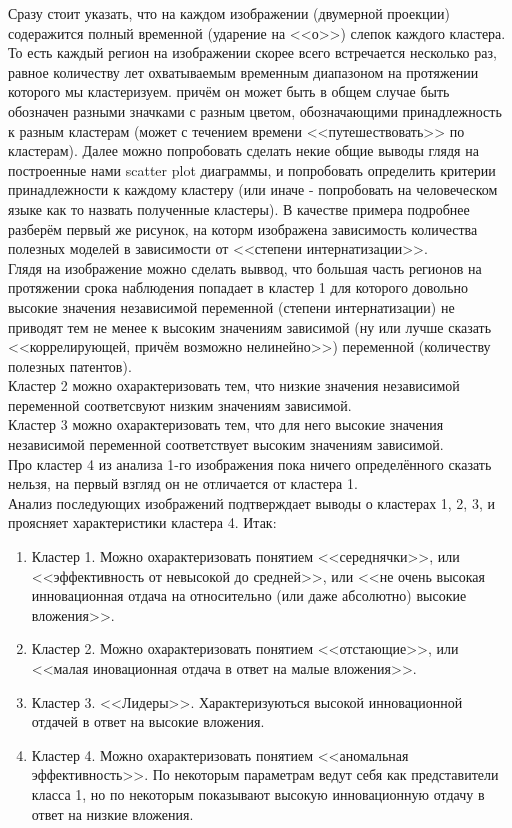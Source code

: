 \documentclass[11pt]{article}
\begin{document}
    Сразу стоит указать, что на каждом изображении (двумерной проекции)
содеражится полный временной (ударение на <<о>>) слепок каждого
кластера. То есть каждый регион на изображении скорее всего встречается
несколько раз, равное количеству лет охватываемым временным диапазоном
на протяжении которого мы кластеризуем. причём он может быть в общем
случае быть обозначен разными значками с разным цветом, обозначающими
принадлежность к разным кластерам (может с течением времени
<<путешествовать>> по кластерам). Далее можно попробовать сделать
некие общие выводы глядя на построенные нами scatter plot диаграммы, и
попробовать определить критерии принадлежности к каждому кластеру (или
иначе - попробовать на человеческом языке как то назвать полученные
кластеры). В качестве примера подробнее разберём первый же рисунок, на
которм изображена зависимость количества полезных моделей в зависимости
от <<степени интернатизации>>. \\Глядя на изображение
можно сделать выввод, что большая часть регионов на протяжении срока
наблюдения попадает в кластер 1 для которого довольно высокие значения
независимой переменной (степени интернатизации) не приводят тем не менее
к высоким значениям зависимой (ну или лучше сказать
<<коррелирующей, причём возможно нелинейно>>) переменной
(количеству полезных патентов). \\Кластер 2 можно
охарактеризовать тем, что низкие значения независимой переменной
соответсвуют низким значениям зависимой. \\Кластер 3 можно
охарактеризовать тем, что для него высокие значения независимой
переменной соответствует высоким значениям зависимой.
\\Про кластер 4 из анализа 1-го изображения пока ничего
определённого сказать нельзя, на первый взгляд он не отличается от
кластера 1. \\Анализ последующих изображений подтверждает
выводы о кластерах 1, 2, 3, и проясняет характеристики кластера 4. Итак:

\begin{enumerate}
\item Кластер 1. Можно охарактеризовать понятием <<середнячки>>, или <<эффективность от невысокой до средней>>, или <<не очень высокая инновационная отдача на относительно (или даже абсолютно) высокие вложения>>.
\item Кластер 2. Можно охарактеризовать понятием <<отстающие>>, или <<малая иновационная отдача в ответ на малые вложения>>.
\item Кластер 3. <<Лидеры>>. Характеризуються высокой инновационной отдачей в ответ на высокие вложения.
\item Кластер 4. Можно охарактеризовать понятием <<аномальная эффективность>>. По некоторым параметрам ведут себя как представители класса 1, но по некоторым показывают высокую инновационную отдачу в ответ на низкие вложения.
\end{enumerate}
\end{document}
